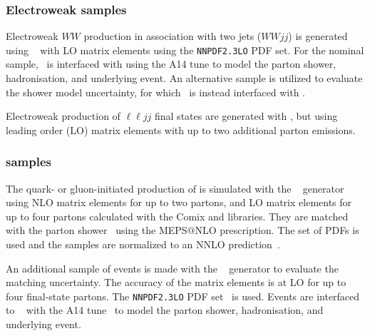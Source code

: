 \subsubsection{Electroweak samples}
Electroweak $WW$ production in association with two jets ($WWjj$) is
generated using \MGFiveNLO~\cite{Alwall:2014hca} with LO matrix elements using the \texttt{NNPDF2.3LO} PDF set.
For the nominal sample, \MGFiveNLO\ is interfaced with  using the
A14 tune to model the parton shower, hadronisation, and underlying event. An
alternative sample is utilized to evaluate the shower model uncertainty, for
which \MGFiveNLO\ is instead interfaced with .

Electroweak production of $\ell\ell jj$ final states are generated with , but using leading
order (LO) matrix elements with up to two additional parton emissions.

\subsubsection{\Zjets samples}

The quark- or gluon-initiated production of \Zjets is simulated with the ~\cite{Bothmann:2019yzt} generator using NLO matrix elements for up to two partons, and LO matrix elements for up to four partons calculated with the Comix and \openloops libraries.
They are matched with the \SHERPA parton shower~\cite{Schumann:2007mg} using the MEPS@NLO prescription.
The \nnpdfnnlo set of PDFs is used and the samples are normalized to an NNLO prediction~\cite{Anastasiou:2003ds}.

An additional sample of \Zjets events is made with the
\MGFiveNLO~\cite{Alwall:2014hca} generator to evaluate the matching
uncertainty. The accuracy of the matrix elements is at LO for up to four
final-state partons. The \texttt{NNPDF2.3LO} PDF set~\cite{Ball:2012cx} is
used. Events are interfaced to ~\cite{Sjostrand:2007gs} with the
A14 tune~\cite{ATL-PHYS-PUB-2014-021} to model the parton shower,
hadronisation, and underlying event.

